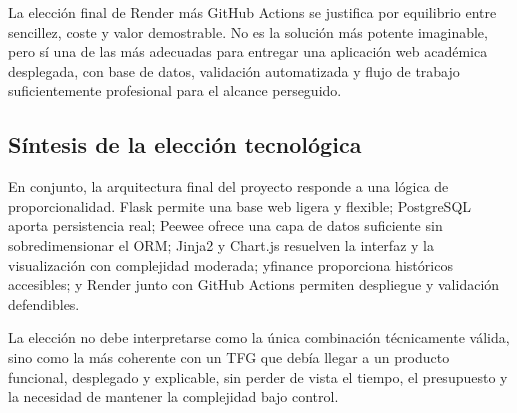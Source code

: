 La elección final de Render más GitHub Actions se justifica por equilibrio entre sencillez, coste y valor demostrable. No es la solución más potente imaginable, pero sí una de las más adecuadas para entregar una aplicación web académica desplegada, con base de datos, validación automatizada y flujo de trabajo suficientemente profesional para el alcance perseguido.

\subsection{Síntesis de la elección tecnológica}

En conjunto, la arquitectura final del proyecto responde a una lógica de proporcionalidad. Flask permite una base web ligera y flexible; PostgreSQL aporta persistencia real; Peewee ofrece una capa de datos suficiente sin sobredimensionar el ORM; Jinja2 y Chart.js resuelven la interfaz y la visualización con complejidad moderada; yfinance proporciona históricos accesibles; y Render junto con GitHub Actions permiten despliegue y validación defendibles.

La elección no debe interpretarse como la única combinación técnicamente válida, sino como la más coherente con un TFG que debía llegar a un producto funcional, desplegado y explicable, sin perder de vista el tiempo, el presupuesto y la necesidad de mantener la complejidad bajo control.
